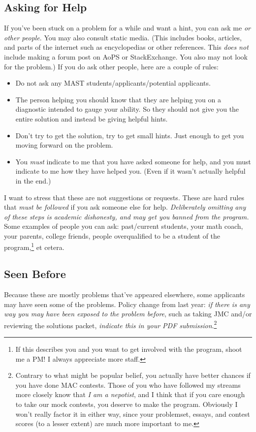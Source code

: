 \documentclass{lucky}
\begin{document}
\subsection{Asking for Help}
If you've been stuck on a problem for a while and want a hint, you can ask me \emph{or other people}. You may also consult static media. (This includes books, articles, and parts of the internet such as encyclopedias or other references. This \emph{does not} include making a forum post on AoPS or StackExchange. You also may not look for the problem.) If you do ask other people, here are a couple of rules:
\begin{itemize}
\item Do not ask any MAST students/applicants/potential applicants.

\item The person helping you should know that they are helping you on a diagnostic intended to gauge your ability. So they should not give you the entire solution and instead be giving helpful hints.

\item Don't try to get the solution, try to get small hints. Just enough to get you moving forward on the problem.

\item You \emph{must} indicate to me that you have asked someone for help, and you must indicate to me how they have helped you. (Even if it wasn't actually helpful in the end.)
\end{itemize}
I want to stress that these are not suggestions or requests. These are hard rules that \emph{must be followed} if you ask someone else for help. \emph{Deliberately omitting any of these steps is academic dishonesty, and may get you banned from the program.} Some examples of people you can ask: past/current students, your math coach, your parents, college friends, people overqualified to be a student of the program,\footnote{If this describes you and you want to get involved with the program, shoot me a PM! I always appreciate more staff.} et cetera.

\subsection{Seen Before}
Because these are mostly problems that've appeared elsewhere, some applicants may have seen some of the problems. Policy change from last year: \emph{if there is any way you may have been exposed to the problem before}, such as taking JMC and/or reviewing the solutions packet, \emph{indicate this in your PDF submission}.\footnote{Contrary to what might be popular belief, you actually have better chances if you have done MAC contests. Those of you who have followed my streams more closely know that \emph{I am a nepotist}, and I think that if you care enough to take our mock contests, you deserve to make the program. Obviously I won't really factor it in either way, since your problemset, essays, and contest scores (to a lesser extent) are much more important to me.}
\end{document}
